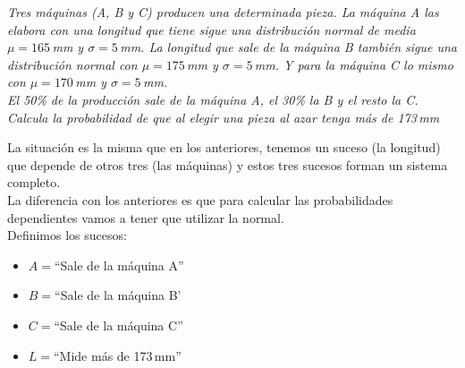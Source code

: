 \documentclass[a4paper,10pt,answers]{exam}
\begin{document}
\begin{questions}
\begin{solution}
\end{solution}
\question\emph{Tres máquinas (A, B y C) producen una determinada pieza. La máquina A las elabora con una longitud que tiene sigue una distribución normal de media $\mu = 165$\,mm y $\sigma = 5$\,mm. La longitud que sale de la máquina B también sigue una distribución normal con $\mu = 175$\,mm y $\sigma = 5$\,mm. Y para la máquina C lo mismo con $\mu = 170$\,mm y $\sigma = 5$\,mm.\\
El 50\% de la producción sale de la máquina A, el 30\% la B y el resto la C. Calcula la probabilidad de que al elegir una pieza al azar tenga más de 173\,mm}
\begin{solution}
La situación es la misma que en los anteriores, tenemos un suceso (la longitud) que depende de otros tres (las máquinas) y estos tres sucesos forman un sistema completo.\\
La diferencia con los anteriores es que para calcular las probabilidades dependientes vamos a tener que utilizar la normal.\\
Definimos los sucesos:
\begin{itemize}
	\item $A=$``Sale de la máquina A''
	\item $B=$``Sale de la máquina B'
	\item $C=$``Sale de la máquina C''
	\item $L=$``Mide más de 173\,mm''

\end{itemize}
\end{solution}
\end{questions}
\end{document}

